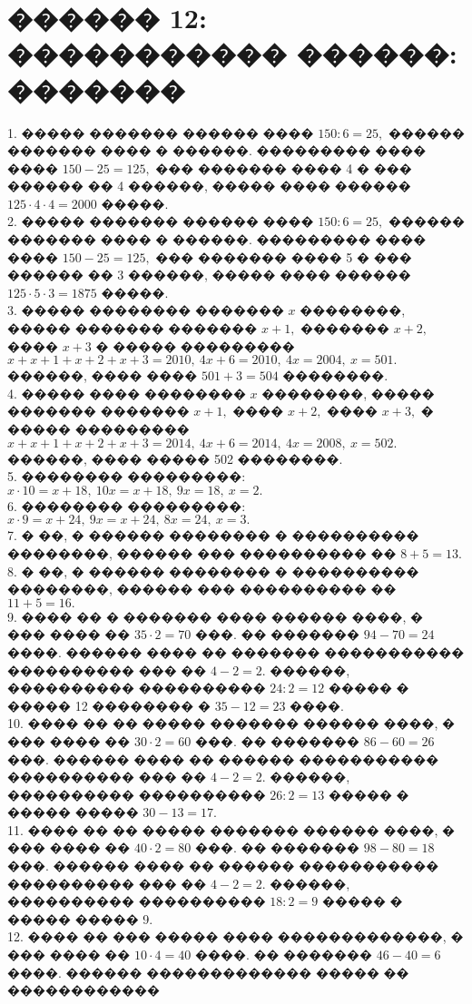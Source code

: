 \documentclass[12pt]{article}
\begin{document}
\section{������ 12: ����������� ������: �������}
1. ����� ������� ������ ���� $150:6=25,$ ������ ������� ���� � ������. ��������� ���� ���� $150-25=125,$ ��� ������� ���� 4 � ��� ������ �� 4 ������, ����� ���� ������ $125\cdot4\cdot4=2000$ �����.\\
2. ����� ������� ������ ���� $150:6=25,$ ������ ������� ���� � ������. ��������� ���� ���� $150-25=125,$ ��� ������� ���� 5 � ��� ������ �� 3 ������, ����� ���� ������ $125\cdot5\cdot3=1875$ �����.\\
3. ����� �������� ������� $x$ ��������, ����� ������� ������� $x+1,$ ������� $x+2,$ ���� $x+3$ � ����� ��������� $x+x+1+x+2+x+3=2010,\ 4x+6=2010,\ 4x=2004,\ x=501.$ ������, ���� ���� $501+3=504$ ��������.\\
4. ����� ���� �������� $x$ ��������, ����� ������� ������� $x+1,$ ���� $x+2,$ ���� $x+3,$ � ����� ��������� $x+x+1+x+2+x+3=2014,\ 4x+6=2014,\ 4x=2008,\ x=502.$ ������, ���� ����� 502 ��������.\\
5. �������� ���������: $x\cdot10=x+18,\ 10x=x+18,\ 9x=18,\ x=2.$\\
6. �������� ���������: $x\cdot9=x+24,\ 9x=x+24,\ 8x=24,\ x=3.$\\
7. � ��, � ������ �������� � ���������� ��������, ������ ��� ���������� �� $8+5=13.$\\
8. � ��, � ������ �������� � ���������� ��������, ������ ��� ���������� �� $11+5=16.$\\
9. ���� �� � ������� ���� ������ ����, � ��� ���� �� $35\cdot2=70$ ���. �� ������� $94-70=24$ ����. ������ ���� �� ������� ����������� ���������� ��� �� $4-2=2.$ ������, ���������� ���������� $24:2=12$ ����� � ����� 12 �������� � $35-12=23$ ����.\\
10. ���� �� �� ����� ������� ������ ����, � ��� ���� ��  $30\cdot2=60$ ���. �� ������� $86-60=26$ ���. ������ ���� �� ������ ����������� ���������� ��� �� $4-2=2.$
������, ���������� ���������� $26:2=13$ ����� � ����� ����� $30-13=17.$\\
11. ���� �� �� ����� ������� ������ ����, � ��� ���� ��  $40\cdot2=80$ ���. �� ������� $98-80=18$ ���. ������ ���� �� ������ ����������� ���������� ��� �� $4-2=2.$
������, ���������� ���������� $18:2=9$ ����� � ����� ����� 9.\\
12. ���� �� ��� ����� ���� �������������, � ��� ���� �� $10\cdot4=40$ ����. �� ������� $46-40=6$ ����. ������ ������������� ����� �� ������������
\end{document}

